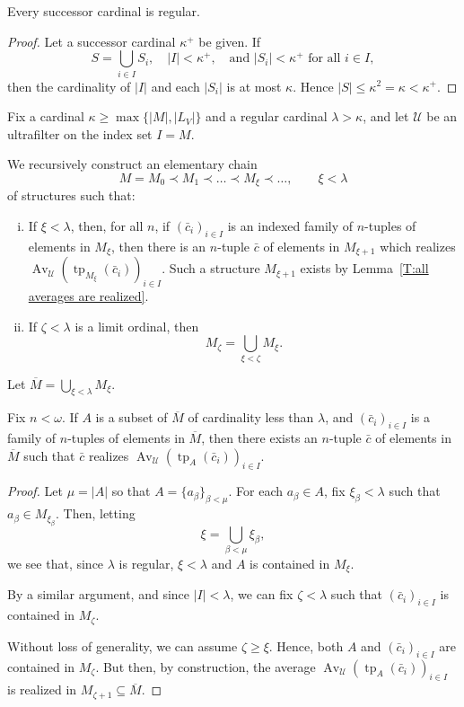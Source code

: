 \documentclass{scrartcl}
\DeclareMathOperator{\Av}{Av }
\DeclareMathOperator{\tp}{tp}
\newcommand{\SU}{\mathscr{U}}
\begin{document}
\begin{proposition}
Every successor cardinal is regular.
\end{proposition}

\begin{proof}
Let a successor cardinal $\kappa^+$ be given. If 
\[
S = \bigcup_{i\in I} S_i, \quad |I|< \kappa^+, \quad \text{and } |S_i| < \kappa^+ \text{ for all } i\in I,
\]
then the cardinality of $|I|$ and each $|S_i|$ is at most $\kappa$. Hence $|S|\leq \kappa^2 =\kappa < \kappa^+$.
\end{proof}



Fix a cardinal $\kappa \geq \max\{|M|,|L_V|\}$ and a regular cardinal $\lambda > \kappa$, and let $\SU$ be an ultrafilter on the index set $I=M$.


We recursively construct an elementary chain
\[
M=M_0\prec M_1\prec\dots\prec M_\xi\prec \dots,
\qquad
\xi<\lambda
\]
of structures such that:
\begin{enumerate}[i)]
\item
If $\xi<\lambda$, then, for all $n$, if $(\bar{c}_i)_{i\in I}$ is an indexed family of $n$-tuples of elements in $M_\xi$, then there is an $n$-tuple $\bar{c}$ of elements in $M_{\xi + 1}$ which realizes $\Av_\SU(\tp_{M_\xi}(\bar{c}_i))_{i\in I}$. Such a structure $M_{\xi +1}$ exists by Lemma~\ref{T:all averages are realized}.

\item
If $\zeta < \lambda$ is a limit ordinal, then
\[
M_{\zeta}=\bigcup_{\xi<\zeta} M_{\xi}.
\]
\end{enumerate}

Let $\overline{M}=\bigcup_{\xi < \lambda} M_{\xi}$.


\begin{proposition}
\label{P:existence of saturated extensions}

Fix $n<\omega$.
If $A$ is a subset of $\overline{M}$ of cardinality less than $\lambda$, and $(\bar{c}_i)_{i\in I}$ is a family of $n$-tuples of elements in $\overline{M}$, then there exists an $n$-tuple $\bar{c}$ of elements in $\overline{M}$ such that $\bar c$ realizes $\Av_{\SU} (\tp_A(\bar c_i))_{i\in I}$.
\end{proposition}

\begin{proof}
Let $\mu = |A|$ so that $A = \{ a_\beta \}_{\beta < \mu}$. For each $a_\beta \in A$, fix $\xi_\beta < \lambda$ such that $a_\beta \in M_{\xi_\beta}$. Then, letting
\[
\xi = \bigcup_{\beta < \mu}\xi_\beta,
\]
we see that, since $\lambda$ is regular, $\xi < \lambda$ and $A$ is contained in $M_\xi$.

By a similar argument, and since $|I|<\lambda$, we can fix $\zeta<\lambda$ such that $(\bar{c}_i)_{i\in I}$ is contained in $M_{\zeta}$.


Without loss of generality, we can assume $\zeta\ge\xi$. Hence, both $A$ and $(\bar{c}_i)_{i\in I}$ are contained in $M_{\zeta}$. But then, by construction, the average
$\Av_{\SU} (\tp_A(\bar c_i))_{i\in I}$ is realized in $M_{\zeta+1}\subseteq \overline{M}$.
\end{proof}
\end{document}
